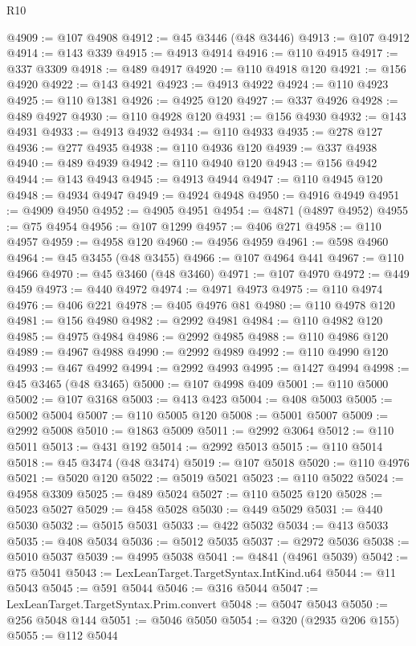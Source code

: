 \begin{lexlean}{R10}
\begin{coremodule}
{{{{{{{{{{{{{{{{{{{{{{{{{{{{{{{{{{{{{{{{{{{{{{{{{{{{{{{{{{{{{{{{{{{{{{{{{{{{{{{{{{{{@4909 := @107 @4908
@4912 := @45 @3446 (@48 @3446)
@4913 := @107 @4912
@4914 := @143 @339
@4915 := @4913 @4914
@4916 := @110 @4915
@4917 := @337 @3309
@4918 := @489 @4917
@4920 := @110 @4918 @120
@4921 := @156 @4920
@4922 := @143 @4921
@4923 := @4913 @4922
@4924 := @110 @4923
@4925 := @110 @1381
@4926 := @4925 @120
@4927 := @337 @4926
@4928 := @489 @4927
@4930 := @110 @4928 @120
@4931 := @156 @4930
@4932 := @143 @4931
@4933 := @4913 @4932
@4934 := @110 @4933
@4935 := @278 @127
@4936 := @277 @4935
@4938 := @110 @4936 @120
@4939 := @337 @4938
@4940 := @489 @4939
@4942 := @110 @4940 @120
@4943 := @156 @4942
@4944 := @143 @4943
@4945 := @4913 @4944
@4947 := @110 @4945 @120
@4948 := @4934 @4947
@4949 := @4924 @4948
@4950 := @4916 @4949
@4951 := @4909 @4950
@4952 := @4905 @4951
@4954 := @4871 (@4897 @4952)
@4955 := @75 @4954
@4956 := @107 @1299
@4957 := @406 @271
@4958 := @110 @4957
@4959 := @4958 @120
@4960 := @4956 @4959
@4961 := @598 @4960
@4964 := @45 @3455 (@48 @3455)
@4966 := @107 @4964 @441
@4967 := @110 @4966
@4970 := @45 @3460 (@48 @3460)
@4971 := @107 @4970
@4972 := @449 @459
@4973 := @440 @4972
@4974 := @4971 @4973
@4975 := @110 @4974
@4976 := @406 @221
@4978 := @405 @4976 @81
@4980 := @110 @4978 @120
@4981 := @156 @4980
@4982 := @2992 @4981
@4984 := @110 @4982 @120
@4985 := @4975 @4984
@4986 := @2992 @4985
@4988 := @110 @4986 @120
@4989 := @4967 @4988
@4990 := @2992 @4989
@4992 := @110 @4990 @120
@4993 := @467 @4992
@4994 := @2992 @4993
@4995 := @1427 @4994
@4998 := @45 @3465 (@48 @3465)
@5000 := @107 @4998 @409
@5001 := @110 @5000
@5002 := @107 @3168
@5003 := @413 @423
@5004 := @408 @5003
@5005 := @5002 @5004
@5007 := @110 @5005 @120
@5008 := @5001 @5007
@5009 := @2992 @5008
@5010 := @1863 @5009
@5011 := @2992 @3064
@5012 := @110 @5011
@5013 := @431 @192
@5014 := @2992 @5013
@5015 := @110 @5014
@5018 := @45 @3474 (@48 @3474)
@5019 := @107 @5018
@5020 := @110 @4976
@5021 := @5020 @120
@5022 := @5019 @5021
@5023 := @110 @5022
@5024 := @4958 @3309
@5025 := @489 @5024
@5027 := @110 @5025 @120
@5028 := @5023 @5027
@5029 := @458 @5028
@5030 := @449 @5029
@5031 := @440 @5030
@5032 := @5015 @5031
@5033 := @422 @5032
@5034 := @413 @5033
@5035 := @408 @5034
@5036 := @5012 @5035
@5037 := @2972 @5036
@5038 := @5010 @5037
@5039 := @4995 @5038
@5041 := @4841 (@4961 @5039)
@5042 := @75 @5041
@5043 := LexLeanTarget.TargetSyntax.IntKind.u64
@5044 := @11 @5043
@5045 := @591 @5044
@5046 := @316 @5044
@5047 := LexLeanTarget.TargetSyntax.Prim.convert
@5048 := @5047 @5043
@5050 := @256 @5048 @144
@5051 := @5046 @5050
@5054 := @320 (@2935 @206 @155)
@5055 := @112 @5044
}}}}}}}}}}}}}}}}}}}}}}}}}}}}}}}}}}}}}}}}}}}}}}}}}}}}}}}}}}}}}}}}}}}}}}}}}}}}}}}}}}}}
\end{coremodule}
\end{lexlean}

